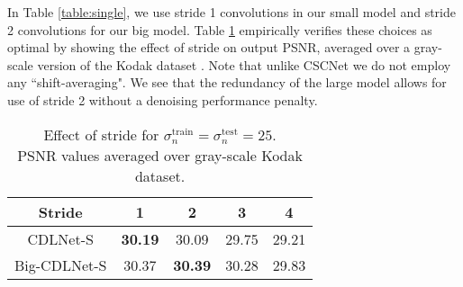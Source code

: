 \documentclass[conference]{IEEEtran}
\begin{document}
\begin{table}[ht]
\centering
\caption{Denoising performance (PSNR) on BSD68 testset ($\sigma = \sigma_n^{\mathrm{train}} = \sigma_n^{\mathrm{test}}$). All learned models trained on BSD432. $\ast$~numbers reported in \cite{Lecouat2020Games}.}
\label{table:single}
\end{table}

In Table \ref{table:single}, we use stride 1 convolutions in our small model and stride 2 convolutions for our big model. Table \ref{table:stride} empirically verifies these choices as optimal by showing the effect of stride on output PSNR, averaged over a gray-scale version of the Kodak dataset \cite{Kodak}. Note that unlike CSCNet we do not employ any ``shift-averaging". We see that the redundancy of the large model allows for use of stride 2 without a denoising performance penalty.


\begin{table}[ht]
\centering
\caption{Effect of stride for $\sigma_n^{\mathrm{train}}=\sigma_n^{\mathrm{test}}=25$.\\ PSNR values averaged over gray-scale Kodak \cite{Kodak} dataset.}
\begin{tabular}{c|c|c|c|c}
\hline
Stride & 1 & 2 & 3 & 4 \\ \hline
CDLNet-S & {\bf 30.19} & 30.09 & 29.75 & 29.21 \\
Big-CDLNet-S & 30.37 & {\bf 30.39} & 30.28 & 29.83 \\ \hline
\end{tabular}\label{table:stride}
\end{table}
\end{document}
